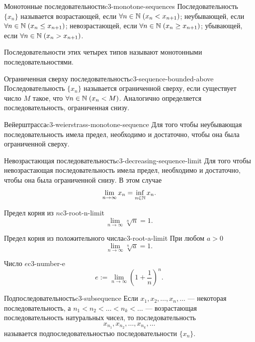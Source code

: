 \begin{definition}{Монотонные последовательности}{c3-monotone-sequences}
  Последовательность $\{x_n\}$ называется возрастающей, если
  $\forall n\in\mathbb{N}\;(x_n<x_{n+1})$; неубывающей, если
  $\forall n\in\mathbb{N}\;(x_n\le x_{n+1})$; невозрастающей, если
  $\forall n\in\mathbb{N}\;(x_n\ge x_{n+1})$; убывающей, если
  $\forall n\in\mathbb{N}\;(x_n>x_{n+1})$.

  Последовательности этих четырех типов называют монотонными
  последовательностями.
\end{definition}

\begin{definition}{Ограниченная сверху последовательность}{c3-sequence-bounded-above}
  Последовательность $\{x_n\}$ называется ограниченной сверху, если
  существует число $M$ такое, что $\forall n\in\mathbb{N}\;(x_n<M)$.
  Аналогично определяется последовательность, ограниченная снизу.
\end{definition}

\begin{theorem}{Вейерштрасса}{c3-weierstrass-monotone-sequence}
  Для того чтобы неубывающая последовательность имела предел, необходимо
  и достаточно, чтобы она была ограниченной сверху.
\end{theorem}

\begin{properties}{Невозрастающая последовательность}{c3-decreasing-sequence-limit}
  Для того чтобы невозрастающая последовательность имела предел, необходимо
  и достаточно, чтобы она была ограниченной снизу. В этом случае
  \[
    \lim_{n\to\infty}x_n=\inf_{n\in\mathbb{N}}x_n.
  \]
\end{properties}

\begin{corollary}{Предел корня из $n$}{c3-root-n-limit}
  \[
    \lim_{n\to\infty}\sqrt[n]{n}=1.
  \]
\end{corollary}

\begin{corollary}{Предел корня из положительного числа}{c3-root-a-limit}
  При любом $a>0$
  \[
    \lim_{n\to\infty}\sqrt[n]{a}=1.
  \]
\end{corollary}

\begin{definition}{Число $e$}{c3-number-e}
  \[
    e:=\lim_{n\to\infty}\left(1+\frac1n\right)^n.
  \]
\end{definition}

\begin{definition}{Подпоследовательность}{c3-subsequence}
  Если $x_1,x_2,\ldots,x_n,\ldots$ — некоторая последовательность, а
  $n_1<n_2<\ldots<n_k<\ldots$ — возрастающая последовательность
  натуральных чисел, то последовательность
  \[
    x_{n_1},x_{n_2},\ldots,x_{n_k},\ldots
  \]
  называется подпоследовательностью последовательности $\{x_n\}$.
\end{definition}

